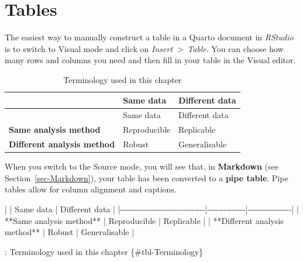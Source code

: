 \documentclass[
  letterpaper,
  DIV=11,
  numbers=noendperiod]{scrreprt}
\newenvironment{Shaded}{\begin{snugshade}}{\end{snugshade}}
\newcommand{\NormalTok}[1]{\textcolor[rgb]{0.00,0.23,0.31}{#1}}
\newcommand{\PreprocessorTok}[1]{\textcolor[rgb]{0.68,0.00,0.00}{#1}}
\begin{document}
\section{Tables}\label{sec-QuartoTables}

The easiest way to manually construct a table in a Quarto document in
\emph{RStudio} is to switch to Visual mode and click on
\emph{Insert~\textgreater~Table}. You can choose how many rows and
columns you need and then fill in your table in the Visual editor.

\begin{longtable}[]{@{}lll@{}}
\caption{Terminology used in this
chapter}\label{tbl-Terminology}\tabularnewline
\toprule\noalign{}
& Same data & Different data \\
\midrule\noalign{}
\endfirsthead
\toprule\noalign{}
& Same data & Different data \\
\midrule\noalign{}
\endhead
\bottomrule\noalign{}
\endlastfoot
\textbf{Same analysis method} & Reproducible & Replicable \\
\textbf{Different analysis method} & Robust & Generalisable \\
\end{longtable}

When you switch to the Source mode, you will see that, in
\textbf{Markdown} (see Section~\ref{sec-Markdown}), your table has been
converted to a \textbf{pipe table}. Pipe tables allow for column
alignment and captions.

\begin{Shaded}
\begin{Highlighting}[]
\PreprocessorTok{|}                               \PreprocessorTok{|}\NormalTok{ Same data    }\PreprocessorTok{|}\NormalTok{ Different data }\PreprocessorTok{|}
\PreprocessorTok{|{-}{-}{-}{-}{-}{-}{-}{-}{-}{-}{-}{-}{-}{-}{-}{-}{-}{-}{-}{-}{-}{-}{-}{-}{-}{-}{-}{-}{-}{-}{-}|{-}{-}{-}{-}{-}{-}{-}{-}{-}{-}{-}{-}{-}{-}|{-}{-}{-}{-}{-}{-}{-}{-}{-}{-}{-}{-}{-}{-}{-}{-}|}
\PreprocessorTok{|}\NormalTok{ **Same analysis method**      }\PreprocessorTok{|}\NormalTok{ Reproducible }\PreprocessorTok{|}\NormalTok{ Replicable     }\PreprocessorTok{|}
\PreprocessorTok{|}\NormalTok{ **Different analysis method** }\PreprocessorTok{|}\NormalTok{ Robust       }\PreprocessorTok{|}\NormalTok{ Generalisable  }\PreprocessorTok{|}

\NormalTok{: Terminology used in this chapter \{\#tbl{-}Terminology\}}
\end{Highlighting}
\end{Shaded}
\end{document}
